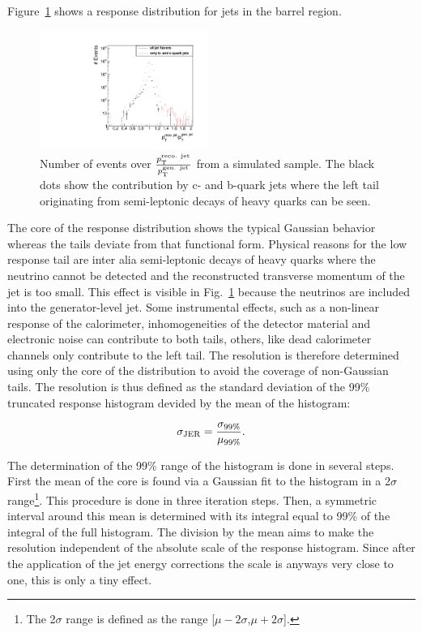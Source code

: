 Figure~\ref{res:fig:TypicalResponse} shows a response distribution for jets in the barrel region.
\begin{figure}[b]
  \centering
      \includegraphics[width=0.49\textwidth]{figures/resolution/generalApproach/intrinsicExampleContributionofBCQuarks.pdf}
  \caption{Number of events over $\frac{p_{\text{T}}^{\text{reco. jet}}}{p_{\text{T}}^{\text{gen. jet}}}$ from a simulated \GAMJET sample. 
           The black dots show the contribution by c- and b-quark jets where the left tail originating from semi-leptonic decays of heavy quarks can be seen.}  
  \label{res:fig:TypicalResponse}
\end{figure}
The core of the response distribution shows the typical Gaussian behavior whereas the tails deviate from that functional form.
Physical reasons for the low response tail are inter alia semi-leptonic decays of heavy quarks where the neutrino cannot be detected and the reconstructed transverse momentum of the jet is too small.
This effect is visible in Fig.~\ref{res:fig:TypicalResponse} because the neutrinos are included into the generator-level jet.
Some instrumental effects, such as a non-linear response of the calorimeter, inhomogeneities of the detector material and electronic noise can contribute to both tails, 
others, like dead calorimeter channels only contribute to the left tail. 
The resolution is therefore determined using only the core of the distribution to avoid the coverage of non-Gaussian tails.
The resolution is thus defined as the standard deviation of the 99\% truncated response histogram devided by the mean of the histogram:

\begin{equation*}\label{res:eq:resolutionFormula}
\sigma_\mathrm{JER} = \frac{\sigma_{99\%}}{\mu_{99\%}}.
\end{equation*}

The determination of the 99\% range of the histogram is done in several steps. 
First the mean of the core is found via a Gaussian fit to the histogram in a 2$\sigma$ range\footnote{The 2$\sigma$ range is defined as the range [$\mu - 2\sigma$,$\mu + 2\sigma$].}. 
This procedure is done in three iteration steps.
Then, a symmetric interval around this mean is determined with its integral equal to 99\% of the integral of the full histogram. 
The division by the mean aims to make the resolution independent of the absolute scale of the response histogram.
Since after the application of the jet energy corrections the scale is anyways very close to one, this is only a tiny effect.

